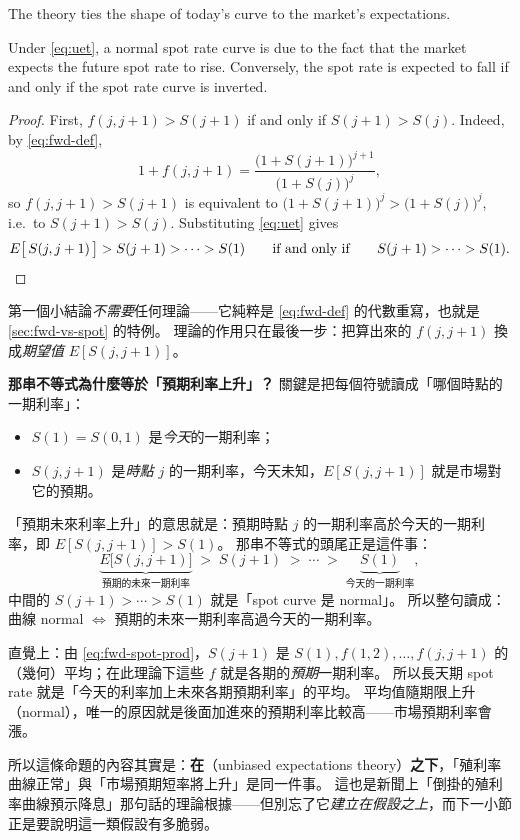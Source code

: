 
The theory ties the shape of today's curve to the market's expectations.

\begin{proposition}
	Under \eqref{eq:uet}, a normal spot rate curve is due to the fact that the market expects the future spot rate to rise.
	Conversely, the spot rate is expected to fall if and only if the spot rate curve is inverted.
\end{proposition}

\begin{proof}
	First, $f(j,j+1)>S(j+1)$ if and only if $S(j+1)>S(j)$.
\suppstart
	Indeed, by \eqref{eq:fwd-def},
	\[
		1+f(j,j+1) = \frac{\bigl(1+S(j+1)\bigr)^{j+1}}{\bigl(1+S(j)\bigr)^{j}} ,
	\]
	so $f(j,j+1)>S(j+1)$ is equivalent to $\bigl(1+S(j+1)\bigr)^{j}>\bigl(1+S(j)\bigr)^{j}$, i.e.\ to $S(j+1)>S(j)$.
\suppend
	Substituting \eqref{eq:uet} gives
	\[
		E\bigl[\,S(j,j+1)\,\bigr] > S(j+1) > \cdots > S(1)
		\qquad\text{if and only if}\qquad
		S(j+1) > \cdots > S(1) . \qedhere
	\]
\end{proof}

\suppstart
\begin{remark}
	第一個小結論\emph{不需要}任何理論——它純粹是 \eqref{eq:fwd-def} 的代數重寫，也就是 \autoref{sec:fwd-vs-spot} 的特例。
	理論的作用只在最後一步：把算出來的 $f(j,j+1)$ 換成\emph{期望值} $E[S(j,j+1)]$。

	\textbf{那串不等式為什麼等於「預期利率上升」？}
	關鍵是把每個符號讀成「哪個時點的一期利率」：
	\begin{itemize}[nosep]
		\item $S(1)=S(0,1)$ 是\emph{今天}的一期利率；
		\item $S(j,j+1)$ 是\emph{時點 $j$} 的一期利率，今天未知，$E[S(j,j+1)]$ 就是市場對它的預期。
	\end{itemize}
	「預期未來利率上升」的意思就是：預期時點 $j$ 的一期利率高於今天的一期利率，即 $E[S(j,j+1)]>S(1)$。
	那串不等式的頭尾正是這件事：
	\[
		\underbrace{E\bigl[S(j,j+1)\bigr]}_{\text{預期的未來一期利率}}
		\;>\; S(j+1) \;>\; \cdots \;>\;
		\underbrace{S(1)}_{\text{今天的一期利率}} ,
	\]
	中間的 $S(j+1)>\cdots>S(1)$ 就是「spot curve 是 normal」。
	所以整句讀成：曲線 normal $\Longleftrightarrow$ 預期的未來一期利率高過今天的一期利率。

	直覺上：由 \eqref{eq:fwd-spot-prod}，$S(j+1)$ 是 $S(1),f(1,2),\ldots,f(j,j+1)$ 的（幾何）平均；在此理論下這些 $f$ 就是各期的\emph{預期}一期利率。
	所以長天期 spot rate 就是「今天的利率加上未來各期預期利率」的平均。
	平均值隨期限上升（normal），唯一的原因就是後面加進來的預期利率比較高——市場預期利率會漲。

	所以這條命題的內容其實是：\textbf{在}（unbiased expectations theory）\textbf{之下}，「殖利率曲線正常」與「市場預期短率將上升」是同一件事。
	這也是新聞上「倒掛的殖利率曲線預示降息」那句話的理論根據——但別忘了它\emph{建立在假設之上}，而下一小節正是要說明這一類假設有多脆弱。
\end{remark}
\suppend

